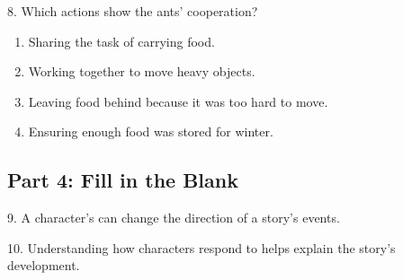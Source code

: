 \documentclass[12pt]{article}
\begin{document}
\vspace{1cm}

8. Which actions show the ants' cooperation?\\
\begin{enumerate}[label=\Alph*.]
    \item Sharing the task of carrying food.  
    \item Working together to move heavy objects.  
    \item Leaving food behind because it was too hard to move.  
    \item Ensuring enough food was stored for winter.  
\end{enumerate}

\vspace{1cm}

\subsection*{Part 4: Fill in the Blank}

9. A character’s \underline{\hspace{4cm}} can change the direction of a story’s events.

\vspace{3cm}

10. Understanding how characters respond to \underline{\hspace{4cm}} helps explain the story’s development.

\vspace{3cm}


\end{document}
